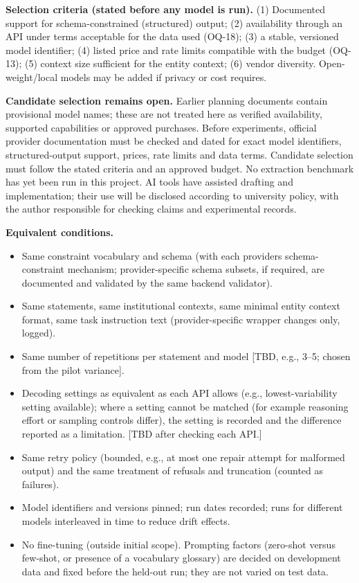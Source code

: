 \documentclass[
  11pt,a4paper,oneside]{report}
\providecommand{\tightlist}{%
  \setlength{\itemsep}{0pt}\setlength{\parskip}{0pt}}
\begin{document}
\textbf{Selection criteria (stated before any model is run).} (1)
Documented support for schema-constrained (structured) output; (2)
availability through an API under terms acceptable for the data used
(OQ-18); (3) a stable, versioned model identifier; (4) listed price and
rate limits compatible with the budget (OQ-13); (5) context size
sufficient for the entity context; (6) vendor diversity.
Open-weight/local models may be added if privacy or cost requires.

\textbf{Candidate selection remains open.} Earlier planning documents contain provisional model names; these are not treated here as verified availability, supported capabilities or approved purchases. Before experiments, official provider documentation must be checked and dated for exact model identifiers, structured-output support, prices, rate limits and data terms. Candidate selection must follow the stated criteria and an approved budget. No extraction benchmark has yet been run in this project. AI tools have assisted drafting and implementation; their use will be disclosed according to university policy, with the author responsible for checking claims and experimental records.

\textbf{Equivalent conditions.}

\begin{itemize}
\tightlist
\item
  Same constraint vocabulary and schema (with each
  provider\textquotesingle s schema-constraint mechanism;
  provider-specific schema subsets, if required, are documented and
  validated by the same backend validator).
\item
  Same statements, same institutional contexts, same minimal entity
  context format, same task instruction text (provider-specific wrapper
  changes only, logged).
\item
  Same number of repetitions per statement and model {[}TBD, e.g., 3--5;
  chosen from the pilot variance{]}.
\item
  Decoding settings as equivalent as each API allows (e.g.,
  lowest-variability setting available); where a setting cannot be
  matched (for example reasoning effort or sampling controls differ),
  the setting is recorded and the difference reported as a limitation.
  {[}TBD after checking each API.{]}
\item
  Same retry policy (bounded, e.g., at most one repair attempt for
  malformed output) and the same treatment of refusals and truncation
  (counted as failures).
\item
  Model identifiers and versions pinned; run dates recorded; runs for
  different models interleaved in time to reduce drift effects.
\item
  No fine-tuning (outside initial scope). Prompting factors (zero-shot
  versus few-shot, or presence of a vocabulary glossary) are decided on
  development data and fixed before the held-out run; they are not
  varied on test data.
\end{itemize}
\end{document}
